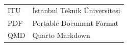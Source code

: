 \begin{tabular}{ll}
ITU & İstanbul Teknik Üniversitesi\\
PDF & Portable Document Format\\
QMD & Quarto Markdown\\
\end{tabular}
